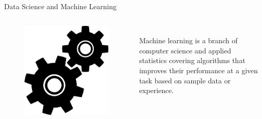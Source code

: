








\begin{frame}{Data Science and Machine Learning}

\begin{columns}
    \begin{figure}
      \includegraphics[width=\textwidth]{plots/gears.png}
    \end{figure}
  \begingroup
  \centering
    \fontsize{20pt}{22pt}\selectfont
    \vspace{1cm}
    \\
Machine learning is a branch of computer science and applied statistics covering algorithms that improves their performance at a given task based on sample data or experience.
  \endgroup
\end{columns}

\end{frame}

